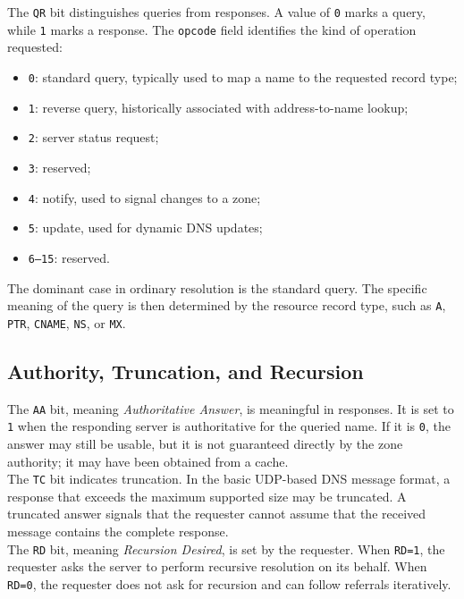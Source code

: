 \documentclass{scrbook}
\begin{document}
	The \texttt{QR} bit distinguishes queries from responses. A value of \texttt{0} marks a query, while \texttt{1} marks a response. The \texttt{opcode} field identifies the kind of operation requested:
	\begin{itemize}
	    \item \texttt{0}: standard query, typically used to map a name to the requested record type;
	    \item \texttt{1}: reverse query, historically associated with address-to-name lookup;
	    \item \texttt{2}: server status request;
	    \item \texttt{3}: reserved;
	    \item \texttt{4}: notify, used to signal changes to a zone;
	    \item \texttt{5}: update, used for dynamic DNS updates;
	    \item \texttt{6--15}: reserved.
	\end{itemize}
	
	The dominant case in ordinary resolution is the standard query. The specific meaning of the query is then determined by the resource record type, such as \texttt{A}, \texttt{PTR}, \texttt{CNAME}, \texttt{NS}, or \texttt{MX}.
	
	\subsection{Authority, Truncation, and Recursion}
	
	The \texttt{AA} bit, meaning \emph{Authoritative Answer}, is meaningful in responses. It is set to \texttt{1} when the responding server is authoritative for the queried name. If it is \texttt{0}, the answer may still be usable, but it is not guaranteed directly by the zone authority; it may have been obtained from a cache.\\
	
	The \texttt{TC} bit indicates truncation. In the basic UDP-based DNS message format, a response that exceeds the maximum supported size may be truncated. A truncated answer signals that the requester cannot assume that the received message contains the complete response.\\
	
	The \texttt{RD} bit, meaning \emph{Recursion Desired}, is set by the requester. When \texttt{RD=1}, the requester asks the server to perform recursive resolution on its behalf. When \texttt{RD=0}, the requester does not ask for recursion and can follow referrals iteratively.\\
	
\end{document}
